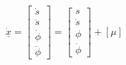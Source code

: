 \begin{equation}\label{linized}
    \underline{\dot{x}} = \begin{bmatrix} \dot{s} \\ \ddot{s} \\ \dot{\phi} \\ \ddot{\phi} \end{bmatrix} =\begin{bmatrix} s \\ \dot{s} \\ \phi \\ \dot{\phi} \end{bmatrix}+  [\mu]
\end{equation}